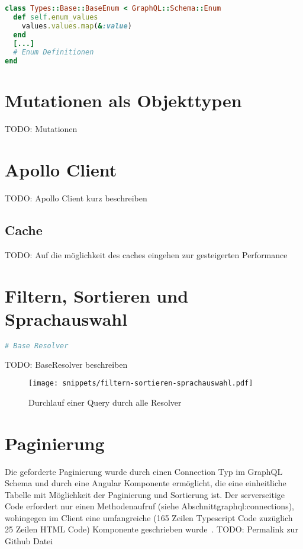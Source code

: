 \begin{lstlisting}[language=Ruby,float=h!,caption={Funktion zum Extrahieren der Enum Werte in ein Array. \lstinline|/graphql/types/base/base_enum.rb|}, label={lst:graphql:enum_values}]
class Types::Base::BaseEnum < GraphQL::Schema::Enum
  def self.enum_values
    values.values.map(&:value)
  end
  [...]
  # Enum Definitionen
end
\end{lstlisting}
\section{Mutationen als Objekttypen}
TODO: Mutationen


\section{Apollo Client}
TODO: Apollo Client kurz beschreiben
\subsection{Cache}
TODO: Auf die möglichkeit des caches eingehen zur gesteigerten Performance

\section{Filtern, Sortieren und Sprachauswahl}
\begin{lstlisting}[language=Ruby,float=h!,caption={ \lstinline|/graphql/resolvers/base_resolver.rb|}, label={lst:graphql:base_resolver}]
# Base Resolver
\end{lstlisting}

TODO: BaseResolver beschreiben
\begin{figure}[h!]
	\centering
	\texttt{[image: snippets/filtern-sortieren-sprachauswahl.pdf]}
	\caption{Durchlauf einer Query durch alle Resolver}
	\label{graphql:evolution}
\end{figure}

\section{Paginierung}
Die geforderte Paginierung wurde durch einen Connection Typ im GraphQL Schema und durch eine Angular Komponente ermöglicht, die eine einheitliche Tabelle mit Möglichkeit der Paginierung und Sortierung ist.
Der serverseitige Code erfordert nur einen Methodenaufruf (siehe Abschnitt{graphql:connections}), wohingegen im Client eine umfangreiche (165 Zeilen Typescript Code zuzüglich 25 Zeilen HTML Code) Komponente geschrieben wurde~\cite{}.
TODO: Permalink zur Github Datei

